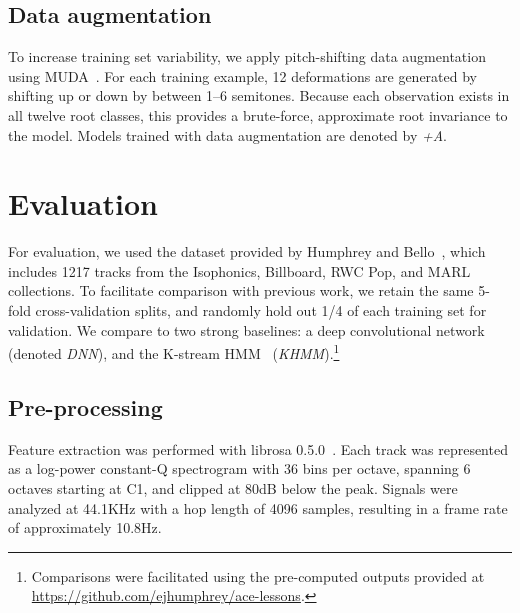 \documentclass{article}
\begin{document}
\subsection{Data augmentation}
\label{sec:muda}
To increase training set variability, we apply pitch-shifting data augmentation using MUDA~\cite{mcfee2015software}.
For each training example, 12 deformations are generated by shifting up or down by between 1--6 semitones.
Because each observation exists in all twelve root classes, this provides a brute-force, approximate root invariance to the model.
Models trained with data augmentation are denoted by \emph{+A}.


\section{Evaluation}
For evaluation, we used the dataset provided by Humphrey and Bello~\cite{humphrey2015four}, which includes 1217 tracks from the Isophonics, Billboard, RWC Pop, and MARL collections.
To facilitate comparison with previous work, we retain the same 5-fold cross-validation splits, and randomly hold out 1/4 of each training set for validation.
We compare to two strong baselines: a deep convolutional network~\cite{humphrey2015four} (denoted \emph{DNN}), and the K-stream HMM~\cite{cho2014improved} (\emph{KHMM}).\footnote{Comparisons were facilitated using the pre-computed outputs provided at \url{https://github.com/ejhumphrey/ace-lessons}.}

\subsection{Pre-processing}

Feature extraction was performed with librosa 0.5.0~\cite{librosa050}.
Each track was represented as a log-power constant-Q spectrogram with 36 bins per octave, spanning 6 octaves starting at C1, and clipped at 80dB below the peak.
Signals were analyzed at 44.1KHz with a hop length of 4096 samples, resulting in a frame rate of approximately 10.8Hz.
\end{document}
